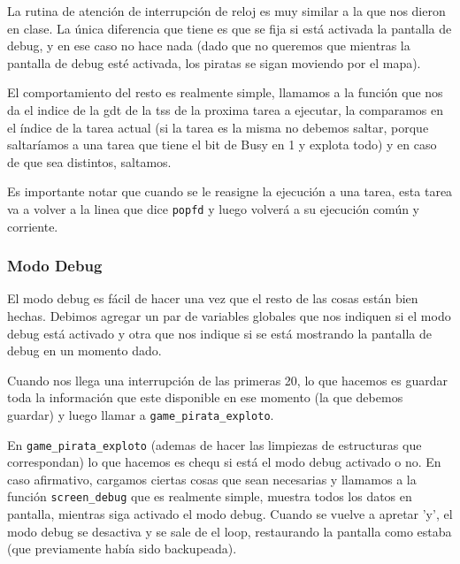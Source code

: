 La rutina de atención de interrupción de reloj es muy similar a la que nos dieron en clase. La única diferencia que tiene es que se fija si está activada la pantalla de debug, y en ese caso no hace nada (dado que no queremos que mientras la pantalla de debug esté activada, los piratas se sigan moviendo por el mapa).
 
El comportamiento del resto es realmente simple, llamamos a la función que nos da el indice de la gdt de la tss de la proxima tarea a ejecutar, la comparamos en el índice de la tarea actual (si la tarea es la misma no debemos saltar, porque saltaríamos a una tarea que tiene el bit de Busy en 1 y explota todo) y en caso de que sea distintos, saltamos.
 
Es importante notar que cuando se le reasigne la ejecución a una tarea, esta tarea va a volver a la linea que dice \texttt{popfd} y luego volverá a su ejecución común y corriente.
 
\subsubsection*{Modo Debug}
 
El modo debug es fácil de hacer una vez que el resto de las cosas están bien hechas. Debimos agregar un par de variables globales que nos indiquen si el modo debug está activado y otra que nos indique si se está mostrando la pantalla de debug en un momento dado.
 
Cuando nos llega una interrupción de las primeras 20, lo que hacemos es guardar toda la información que este disponible en ese momento (la que debemos guardar) y luego llamar a \texttt{game_pirata_exploto}.
 
En \texttt{game_pirata_exploto} (ademas de hacer las limpiezas de estructuras que correspondan) lo que hacemos es chequ si está el modo debug activado o no. En caso afirmativo, cargamos ciertas cosas que sean necesarias y llamamos a la función \texttt{screen_debug} que es realmente simple, muestra todos los datos en pantalla, mientras siga activado el modo debug. Cuando se vuelve a apretar 'y', el modo debug se desactiva y se sale de el loop, restaurando la pantalla como estaba (que previamente había sido backupeada).
 


